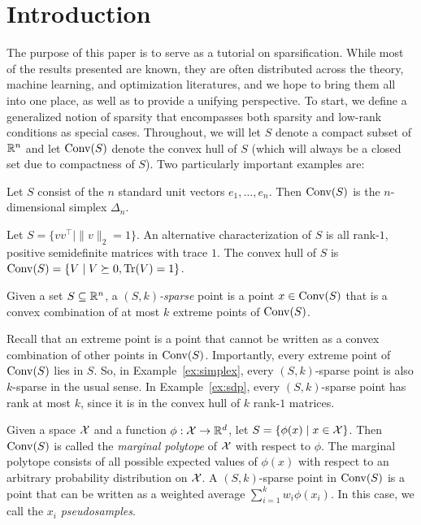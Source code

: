 \documentclass[paper.tex]{subfiles}
\begin{document}
\section{Introduction} 
\label{sec:intro}

The purpose of this paper is to serve as a tutorial on sparsification. While 
most of the results presented are known, they are often distributed across the 
theory, machine learning, and optimization literatures, and we hope to bring 
them all into one place, as well as to provide a unifying perspective. To start, 
we define a generalized notion of sparsity that encompasses both sparsity and 
low-rank conditions as special cases. Throughout, we will let $S$ denote a 
compact subset of $\mathbb{R}^n$ and let $\operatorname{Conv}(S)$ denote the convex hull of $S$ 
(which will always be a closed set due to compactness of $S$). Two particularly 
important examples are:
\begin{example}
\label{ex:simplex}
Let $S$ consist of the $n$ standard unit vectors $e_1, \ldots, e_n$. Then 
$\operatorname{Conv}(S)$ is the $n$-dimensional simplex $\Delta_n$.
\end{example}

\begin{example}
\label{ex:sdp}
Let $S = \{vv^{\top} \mid \|v\|_2 = 1\}$. An alternative characterization 
of $S$ is all rank-$1$, positive semidefinite matrices with trace $1$. The 
convex hull of $S$ is $\operatorname{Conv}(S) = \{V \mid V \succeq 0, \operatorname{Tr}(V) = 1\}$.
\end{example}

\begin{definition}
Given a set $S \subseteq \mathbb{R}^n$, a \emph{$(S, k)$-sparse} point is a point 
$x \in \operatorname{Conv}(S)$ that is a convex combination of at most $k$ extreme 
points of $\operatorname{Conv}(S)$.
\end{definition}

Recall that an extreme point is a point that cannot be written as a convex 
combination of other points in $\operatorname{Conv}(S)$. Importantly, every extreme point 
of $\operatorname{Conv}(S)$ lies in $S$. So, in Example~\ref{ex:simplex}, every 
$(S,k)$-sparse point is also $k$-sparse in the usual sense. In 
Example~\ref{ex:sdp}, every $(S,k)$-sparse point has rank at most $k$, since 
it is in the convex hull of $k$ rank-$1$ matrices.

\begin{example}
\label{ex:marginal-polytope}
Given a space $\mathcal{X}$ and a function $\phi : \mathcal{X} \to \mathbb{R}^d$, let 
$S = \{\phi(x) \mid x \in \mathcal{X}\}$. Then $\operatorname{Conv}(S)$ is called the 
\emph{marginal polytope} of $\mathcal{X}$ with respect to $\phi$. The 
marginal polytope consists of all possible expected values of 
$\phi(x)$ with respect to an arbitrary probability distribution 
on $\mathcal{X}$. A $(S,k)$-sparse point in $\operatorname{Conv}(S)$ is a point that 
can be written as a weighted average $\sum_{i=1}^k w_i \phi(x_i)$. 
In this case, we call the $x_i$ \emph{pseudosamples}.
\end{example}
\end{document}
